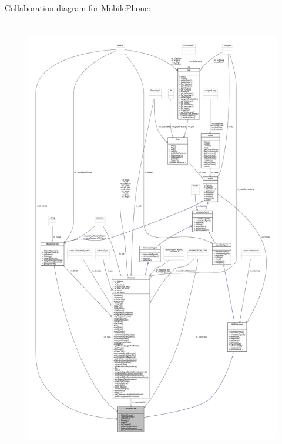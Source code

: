 Collaboration diagram for Mobile\+Phone\+:\nopagebreak
\begin{figure}[H]
\begin{center}
\leavevmode
\includegraphics[height=550pt]{class_mobile_phone__coll__graph}
\end{center}
\end{figure}
